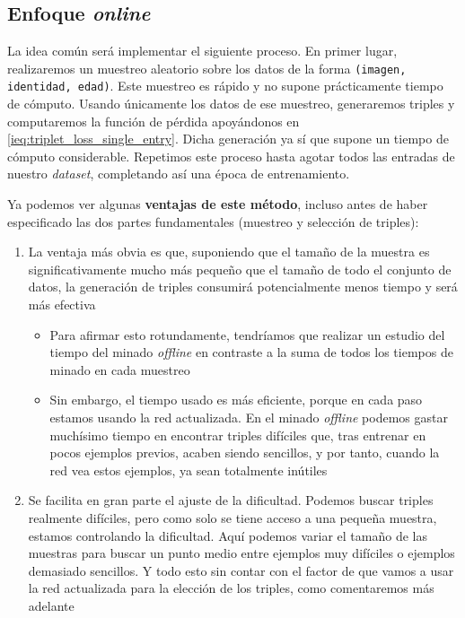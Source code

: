 \subsection{Enfoque \textit{online}} \label{isubs:triples_online}

La idea común será implementar el siguiente proceso. En primer lugar, realizaremos un muestreo aleatorio sobre los datos de la forma \lstinline{(imagen, identidad, edad)}. Este muestreo es rápido y no supone prácticamente tiempo de cómputo. Usando únicamente los datos de ese muestreo, generaremos triples y computaremos la función de pérdida apoyándonos en \eqref{ieq:triplet_loss_single_entry}. Dicha generación ya sí que supone un tiempo de cómputo considerable. Repetimos este proceso hasta agotar todos las entradas de nuestro \textit{dataset}, completando así una época de entrenamiento.

Ya podemos ver algunas \textbf{ventajas de este método}, incluso antes de haber especificado las dos partes fundamentales (muestreo y selección de triples):

\begin{enumerate}
    \item La ventaja más obvia es que, suponiendo que el tamaño de la muestra es significativamente mucho más pequeño que el tamaño de todo el conjunto de datos, la generación de triples consumirá potencialmente menos tiempo y será más efectiva
        \begin{itemize}
            \item Para afirmar esto rotundamente, tendríamos que realizar un estudio del tiempo del minado \textit{offline} en contraste a la suma de todos los tiempos de minado en cada muestreo
            \item Sin embargo, el tiempo usado es más eficiente, porque en cada paso estamos usando la red actualizada. En el minado \textit{offline} podemos gastar muchísimo tiempo en encontrar triples difíciles que, tras entrenar en pocos ejemplos previos, acaben siendo sencillos, y por tanto, cuando la red vea estos ejemplos, ya sean totalmente inútiles
        \end{itemize}
    \item Se facilita en gran parte el ajuste de la dificultad. Podemos buscar triples realmente difíciles, pero como solo se tiene acceso a una pequeña muestra, estamos controlando la dificultad. Aquí podemos variar el tamaño de las muestras para buscar un punto medio entre ejemplos muy difíciles o ejemplos demasiado sencillos. Y todo esto sin contar con el factor de que vamos a usar la red actualizada para la elección de los triples, como comentaremos más adelante
\end{enumerate}

